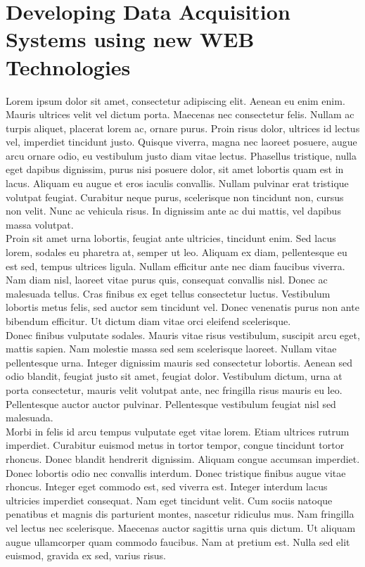 \chapter{Developing Data Acquisition Systems using new WEB Technologies}
\label{chap:III-2-web-daq}

Lorem ipsum dolor sit amet, consectetur adipiscing elit. Aenean eu enim enim. Mauris ultrices velit vel dictum porta. Maecenas nec consectetur felis. Nullam ac turpis aliquet, placerat lorem ac, ornare purus. Proin risus dolor, ultrices id lectus vel, imperdiet tincidunt justo. Quisque viverra, magna nec laoreet posuere, augue arcu ornare odio, eu vestibulum justo diam vitae lectus. Phasellus tristique, nulla eget dapibus dignissim, purus nisi posuere dolor, sit amet lobortis quam est in lacus. Aliquam eu augue et eros iaculis convallis. Nullam pulvinar erat tristique volutpat feugiat. Curabitur neque purus, scelerisque non tincidunt non, cursus non velit. Nunc ac vehicula risus. In dignissim ante ac dui mattis, vel dapibus massa volutpat. \\

Proin sit amet urna lobortis, feugiat ante ultricies, tincidunt enim. Sed lacus lorem, sodales eu pharetra at, semper ut leo. Aliquam ex diam, pellentesque eu est sed, tempus ultrices ligula. Nullam efficitur ante nec diam faucibus viverra. Nam diam nisl, laoreet vitae purus quis, consequat convallis nisl. Donec ac malesuada tellus. Cras finibus ex eget tellus consectetur luctus. Vestibulum lobortis metus felis, sed auctor sem tincidunt vel. Donec venenatis purus non ante bibendum efficitur. Ut dictum diam vitae orci eleifend scelerisque. \\

Donec finibus vulputate sodales. Mauris vitae risus vestibulum, suscipit arcu eget, mattis sapien. Nam molestie massa sed sem scelerisque laoreet. Nullam vitae pellentesque urna. Integer dignissim mauris sed consectetur lobortis. Aenean sed odio blandit, feugiat justo sit amet, feugiat dolor. Vestibulum dictum, urna at porta consectetur, mauris velit volutpat ante, nec fringilla risus mauris eu leo. Pellentesque auctor auctor pulvinar. Pellentesque vestibulum feugiat nisl sed malesuada. \\

Morbi in felis id arcu tempus vulputate eget vitae lorem. Etiam ultrices rutrum imperdiet. Curabitur euismod metus in tortor tempor, congue tincidunt tortor rhoncus. Donec blandit hendrerit dignissim. Aliquam congue accumsan imperdiet. Donec lobortis odio nec convallis interdum. Donec tristique finibus augue vitae rhoncus. Integer eget commodo est, sed viverra est. Integer interdum lacus ultricies imperdiet consequat. Nam eget tincidunt velit. Cum sociis natoque penatibus et magnis dis parturient montes, nascetur ridiculus mus. Nam fringilla vel lectus nec scelerisque. Maecenas auctor sagittis urna quis dictum. Ut aliquam augue ullamcorper quam commodo faucibus. Nam at pretium est. Nulla sed elit euismod, gravida ex sed, varius risus. \\

